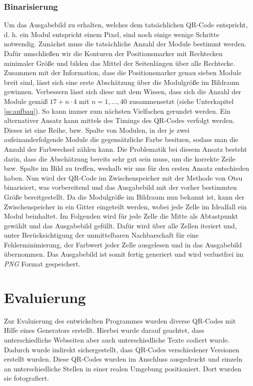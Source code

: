 \documentclass[a4paper, oneside, 12pt]{article}
\begin{document}
\subsubsection{Binarisierung}

Um das Ausgabebild zu erhalten, welches dem tatsächlichen QR-Code entspricht, d. h. ein Modul entspricht einem Pixel, sind noch einige wenige Schritte notwendig.
Zunächst muss die tatsächliche Anzahl der Module bestimmt werden.
Dafür umschließen wir die Konturen der Positionsmarker mit Rechtecken minimaler Größe und bilden das Mittel der Seitenlängen über alle Rechtecke.
Zusammen mit der Information, dass die Positionsmarker genau sieben Module breit sind, lässt sich eine erste Abschätzung über die Modulgröße im Bildraum gewinnen.
Verbessern lässt sich diese mit dem Wissen, dass sich die Anzahl der Module gemäß $17 + n \cdot 4$ mit $n = 1, \dots, 40$ zusammensetzt (siehe Unterkapitel \ref{ss:aufbau}). So kann immer zum nächsten Vielfachen gerundet werden.
Ein alternativer Ansatz kann mittels des Timings des QR-Codes verfolgt werden.
Dieses ist eine Reihe, bzw. Spalte von Modulen, in der je zwei aufeinanderfolgende Module die gegensätzliche Farbe besitzen, sodass man die Anzahl der Farbwechsel zählen kann. Die Problematik bei diesem Ansatz besteht darin, dass die Abschätzung bereits sehr gut sein muss, um die korrekte Zeile bzw. Spalte im Bild zu treffen, weshalb wir uns für den ersten Ansatz entschieden haben.
Nun wird der QR-Code im Zwischenspeicher mit der Methode von Otsu binarisiert, was vorbereitend und das Ausgabebild mit der vorher bestimmten Größe bereitgestellt.
Da die Modulgröße im Bildraum nun bekannt ist, kann der Zwischenspeicher in ein Gitter eingeteilt werden, wobei jede Zelle im Idealfall ein Modul beinhaltet.
Im Folgenden wird für jede Zelle die Mitte als Abtastpunkt gewählt und das Ausgabebild gefüllt. Dafür wird über alle Zellen iteriert und, unter Berücksichtigung der unmittelbaren Nachbarschaft für eine Fehlerminimierung, der Farbwert jeder Zelle ausgelesen und in das Ausgabebild übernommen.
Das Ausgabebild ist somit fertig generiert und wird verlustfrei im \emph{PNG} Format gespeichert.

\newpage
\section{Evaluierung}
\label{s:evaluierung}

Zur Evaluierung des entwickelten Programmes wurden diverse QR-Codes mit Hilfe eines Generators erstellt. Hierbei wurde darauf geachtet, dass unterschiedliche Webseiten aber auch unterschiedliche Texte codiert wurde. Dadurch wurde indirekt sichergestellt, dass QR-Codes verschiedener Versionen erstellt wurden. Diese QR-Codes wurden im Anschluss ausgedruckt und einzeln an unterschiedliche Stellen in einer realen Umgebung positioniert. Dort wurden sie fotografiert. 
\end{document}
